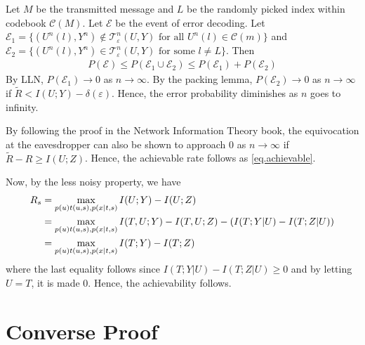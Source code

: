 \documentclass[12pt, Draft, onecolumn]{IEEEtran}
\def\ie{{\it i.e., }}
\def\calC{{\mathcal{C}}}
\def\calE{{\mathcal{E}}}
\def\calT{{\mathcal{T}}}
\begin{document}
Let $M$ be the transmitted message and $L$ be the randomly picked index within codebook $\calC(M)$. Let $\calE$ be the event of error decoding. Let $\calE_1=\{(U^n(l), Y^n)\notin\calT^n_{\varepsilon}(U,Y) \text{ for all $U^n(l)\in \calC(m)$}\}$ and $\calE_2=\{(U^n(l), Y^n)\in\calT^n_{\varepsilon}(U,Y) \text{ for some $l\neq L$}\}$. Then
\begin{align*}
P(\calE)\leq P(\calE_1\cup\calE_2) \leq P(\calE_1)+P(\calE_2)
\end{align*}
By LLN, $P(\calE_1)\rightarrow 0$ as $n\rightarrow \infty$. By the packing lemma, $P(\calE_2)\rightarrow 0$ as $n\rightarrow \infty$ if $\tilde{R}<I(U;Y)-\delta(\varepsilon)$. Hence, the error probability diminishes as $n$ goes to infinity.

By following the proof in the Network Information Theory book, the equivocation at the eavesdropper can also be shown to approach $0$ as $n\rightarrow \infty$ if $\tilde{R}-R\geq I(U;Z)$. Hence, the achievable rate follows as \eqref{eq.achievable}.

Now, by the less noisy property, we have
\begin{align}
R_s &= \max_{p(u)t(u,s),p(x|t,s)} I(U;Y)-I(U;Z)\notag\\
&= \max_{p(u)t(u,s),p(x|t,s)} I(T,U;Y)-I(T,U;Z)-(I(T;Y|U)-I(T;Z|U))\notag\\
&= \max_{p(u)t(u,s),p(x|t,s)} I(T;Y)-I(T;Z)
\end{align}
where the last equality follows since $I(T;Y|U)-I(T;Z|U)\geq 0$ and by letting $U=T$, it is made $0$. Hence, the achievability follows.

\section{Converse Proof}
\end{document}
